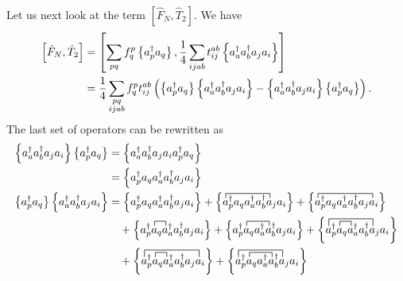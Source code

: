 Let us next look at the term $\left[ \hat{F}_N, \hat{T}_2 \right]$. We have
    \begin{align*}
        \left[ \hat{F}_N, \hat{T}_2 \right] 
        &= \left[\sum_{pq} f_q^p \left\{a^\dagger_p a_q\right\},
            \frac{1}{4}\sum_{ijab} t_{ij}^{ab} \left\{a^\dagger_a a^\dagger_b a_j a_i\right\} \right] \\
        &= \frac{1}{4}\sum_{\substack{pq\\ijab}}
            f_q^p t_{ij}^{ab}
        \left( \left\{a^\dagger_p a_q\right\} \left\{a^\dagger_a a^\dagger_b a_j a_i\right\}
            - \left\{a^\dagger_a a^\dagger_b a_j a_i\right\} \left\{a^\dagger_p a_q\right\} \right).
    \end{align*}
The last set of operators can be rewritten as 
    \begin{align*}
        \normord{a^\dagger_a a^\dagger_b a_j a_i} \normord{a^\dagger_p a_q} &= 
            \normord{a^\dagger_a a^\dagger_b a_j a_i a^\dagger_p a_q} \\ 
        &= \normord{a^\dagger_p a_q a^\dagger_a a^\dagger_b a_j a_i} 
        \\
        \normord{a^\dagger_p a_q} \normord{a^\dagger_a a^\dagger_b a_j a_i} &= 
            \normord{a^\dagger_p a_q a^\dagger_a a^\dagger_b a_j a_i}
        + \left\{ 
        \contraction{}{a}{{}^\dagger_pa_q a^\dagger_a a^\dagger_b}{a}
        a^\dagger_p a_q a^\dagger_a a^\dagger_b a_j a_i\right\}
        + \left\{ 
        \contraction{}{a}{{}^\dagger_pa_q a^\dagger_a a^\dagger_b a_j}{a}
        a^\dagger_p a_q a^\dagger_a a^\dagger_b a_j a_i\right\} \\
        & \quad 
        + \left\{ 
        \contraction{a^\dagger_p}{a}{{}_q}{a}
        a^\dagger_p a_q a^\dagger_a a^\dagger_b a_j a_i\right\}
        + \left\{ 
        \contraction{a^\dagger_p}{a}{{}_q a^\dagger_a}{a}
        a^\dagger_p a_q a^\dagger_a a^\dagger_b a_j a_i\right\}
        + \left\{ 
        \contraction{a^\dagger_p}{a}{{}_q}{a}
        \contraction[1.5ex]{}{a}{{}^\dagger_pa_q a^\dagger_a a^\dagger_b}{a}
        a^\dagger_p a_q a^\dagger_a a^\dagger_b a_j a_i\right\} \\
        & \quad 
        + \left\{ 
        \contraction{a^\dagger_p}{a}{{}_q}{a}
        \contraction[1.5ex]{}{a}{{}^\dagger_pa_q a^\dagger_a a^\dagger_b a_j}{a}
        a^\dagger_p a_q a^\dagger_a a^\dagger_b a_j a_i\right\}
        + \left\{ 
        \contraction{a^\dagger_p}{a}{{}_q a^\dagger_a}{a}
        \contraction[1.5ex]{}{a}{{}^\dagger_pa_q a^\dagger_a a^\dagger_b}{a}
        a^\dagger_p a_q a^\dagger_a a^\dagger_b a_j a_i\right\}

\end{align*}
